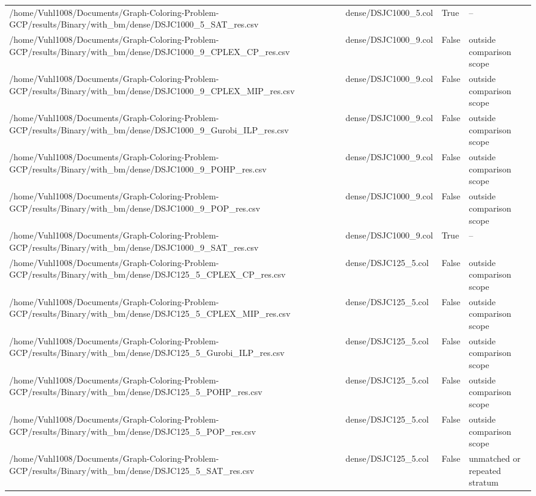 \begin{table}[htbp]
\begin{tabular}{llll}
/home/Vuhl1008/Documents/Graph-Coloring-Problem-GCP/results/Binary/with\_bm/dense/DSJC1000\_5\_SAT\_res.csv & dense/DSJC1000\_5.col & True & -- \\
/home/Vuhl1008/Documents/Graph-Coloring-Problem-GCP/results/Binary/with\_bm/dense/DSJC1000\_9\_CPLEX\_CP\_res.csv & dense/DSJC1000\_9.col & False & outside comparison scope \\
/home/Vuhl1008/Documents/Graph-Coloring-Problem-GCP/results/Binary/with\_bm/dense/DSJC1000\_9\_CPLEX\_MIP\_res.csv & dense/DSJC1000\_9.col & False & outside comparison scope \\
/home/Vuhl1008/Documents/Graph-Coloring-Problem-GCP/results/Binary/with\_bm/dense/DSJC1000\_9\_Gurobi\_ILP\_res.csv & dense/DSJC1000\_9.col & False & outside comparison scope \\
/home/Vuhl1008/Documents/Graph-Coloring-Problem-GCP/results/Binary/with\_bm/dense/DSJC1000\_9\_POHP\_res.csv & dense/DSJC1000\_9.col & False & outside comparison scope \\
/home/Vuhl1008/Documents/Graph-Coloring-Problem-GCP/results/Binary/with\_bm/dense/DSJC1000\_9\_POP\_res.csv & dense/DSJC1000\_9.col & False & outside comparison scope \\
/home/Vuhl1008/Documents/Graph-Coloring-Problem-GCP/results/Binary/with\_bm/dense/DSJC1000\_9\_SAT\_res.csv & dense/DSJC1000\_9.col & True & -- \\
/home/Vuhl1008/Documents/Graph-Coloring-Problem-GCP/results/Binary/with\_bm/dense/DSJC125\_5\_CPLEX\_CP\_res.csv & dense/DSJC125\_5.col & False & outside comparison scope \\
/home/Vuhl1008/Documents/Graph-Coloring-Problem-GCP/results/Binary/with\_bm/dense/DSJC125\_5\_CPLEX\_MIP\_res.csv & dense/DSJC125\_5.col & False & outside comparison scope \\
/home/Vuhl1008/Documents/Graph-Coloring-Problem-GCP/results/Binary/with\_bm/dense/DSJC125\_5\_Gurobi\_ILP\_res.csv & dense/DSJC125\_5.col & False & outside comparison scope \\
/home/Vuhl1008/Documents/Graph-Coloring-Problem-GCP/results/Binary/with\_bm/dense/DSJC125\_5\_POHP\_res.csv & dense/DSJC125\_5.col & False & outside comparison scope \\
/home/Vuhl1008/Documents/Graph-Coloring-Problem-GCP/results/Binary/with\_bm/dense/DSJC125\_5\_POP\_res.csv & dense/DSJC125\_5.col & False & outside comparison scope \\
/home/Vuhl1008/Documents/Graph-Coloring-Problem-GCP/results/Binary/with\_bm/dense/DSJC125\_5\_SAT\_res.csv & dense/DSJC125\_5.col & False & unmatched or repeated stratum \\

\end{tabular}
\end{table}
